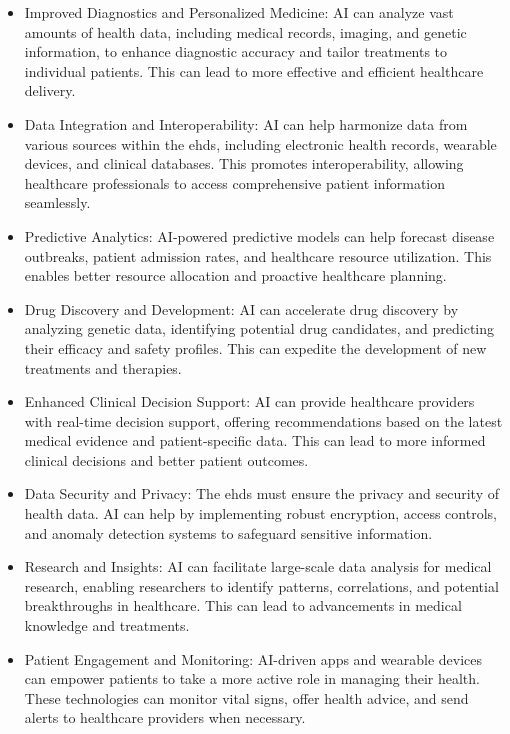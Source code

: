 \begin{itemize}
    \item Improved Diagnostics and Personalized Medicine: AI can analyze vast amounts of health data, including medical records, imaging, and genetic information, to enhance diagnostic accuracy and tailor treatments to individual patients. This can lead to more effective and efficient healthcare delivery.
\item Data Integration and Interoperability: AI can help harmonize data from various sources within the \ac{ehds}, including electronic health records, wearable devices, and clinical databases. This promotes interoperability, allowing healthcare professionals to access comprehensive patient information seamlessly.

\item Predictive Analytics: AI-powered predictive models can help forecast disease outbreaks, patient admission rates, and healthcare resource utilization. This enables better resource allocation and proactive healthcare planning.

\item Drug Discovery and Development: AI can accelerate drug discovery by analyzing genetic data, identifying potential drug candidates, and predicting their efficacy and safety profiles. This can expedite the development of new treatments and therapies.

\item Enhanced Clinical Decision Support: AI can provide healthcare providers with real-time decision support, offering recommendations based on the latest medical evidence and patient-specific data. This can lead to more informed clinical decisions and better patient outcomes.

\item Data Security and Privacy: The \ac{ehds} must ensure the privacy and security of health data. AI can help by implementing robust encryption, access controls, and anomaly detection systems to safeguard sensitive information.

\item Research and Insights: AI can facilitate large-scale data analysis for medical research, enabling researchers to identify patterns, correlations, and potential breakthroughs in healthcare. This can lead to advancements in medical knowledge and treatments.

\item Patient Engagement and Monitoring: AI-driven apps and wearable devices can empower patients to take a more active role in managing their health. These technologies can monitor vital signs, offer health advice, and send alerts to healthcare providers when necessary.


\end{itemize}
